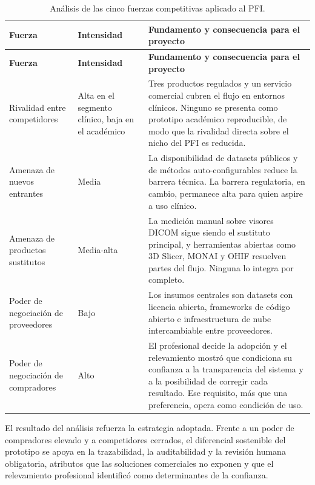 \begingroup
\small
\sloppy
\setlength{\emergencystretch}{3em}
\setlength{\tabcolsep}{3pt}
\setlength{\LTleft}{0pt}
\setlength{\LTright}{0pt}
\renewcommand{\arraystretch}{1.15}
\begin{longtable}{|>{\raggedright\arraybackslash}p{}|>{\raggedright\arraybackslash}p{}|>{\raggedright\arraybackslash}p{}|}
\caption{Análisis de las cinco fuerzas competitivas aplicado al PFI.}
\label{tab:estado-arte-porter}\\
\hline
\textbf{Fuerza} & \textbf{Intensidad} & \textbf{Fundamento y consecuencia para el proyecto} \\
\hline
\endfirsthead
\hline
\textbf{Fuerza} & \textbf{Intensidad} & \textbf{Fundamento y consecuencia para el proyecto} \\
\hline
\endhead
Rivalidad entre competidores & Alta en el segmento clínico, baja en el académico & Tres productos regulados y un servicio comercial cubren el flujo en entornos clínicos. Ninguno se presenta como prototipo académico reproducible, de modo que la rivalidad directa sobre el nicho del PFI es reducida. \\
\hline
Amenaza de nuevos entrantes & Media & La disponibilidad de datasets públicos y de métodos auto-configurables reduce la barrera técnica. La barrera regulatoria, en cambio, permanece alta para quien aspire a uso clínico. \\
\hline
Amenaza de productos sustitutos & Media-alta & La medición manual sobre visores DICOM sigue siendo el sustituto principal, y herramientas abiertas como 3D Slicer, MONAI y OHIF resuelven partes del flujo. Ninguna lo integra por completo. \\
\hline
Poder de negociación de proveedores & Bajo & Los insumos centrales son datasets con licencia abierta, frameworks de código abierto e infraestructura de nube intercambiable entre proveedores. \\
\hline
Poder de negociación de compradores & Alto & El profesional decide la adopción y el relevamiento mostró que condiciona su confianza a la transparencia del sistema y a la posibilidad de corregir cada resultado. Ese requisito, más que una preferencia, opera como condición de uso. \\
\hline
\end{longtable}
\endgroup

El resultado del análisis refuerza la estrategia adoptada. Frente a un poder de compradores elevado y a competidores cerrados, el diferencial sostenible del prototipo se apoya en la trazabilidad, la auditabilidad y la revisión humana obligatoria, atributos que las soluciones comerciales no exponen y que el relevamiento profesional identificó como determinantes de la confianza.

